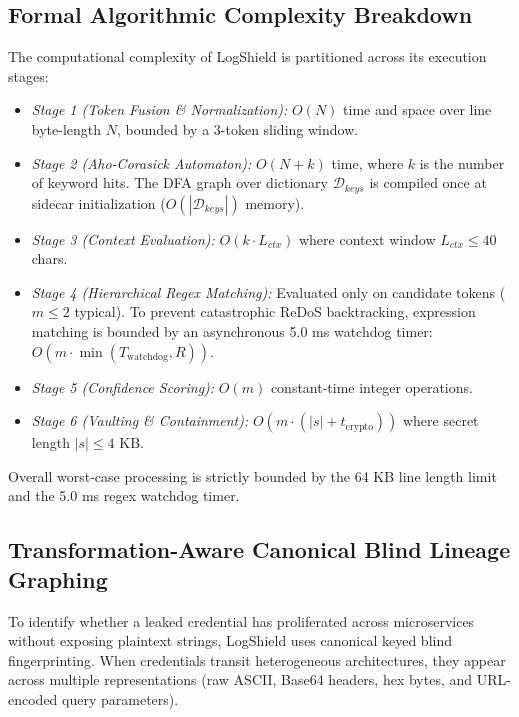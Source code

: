 \documentclass[conference]{IEEEtran}
\begin{document}
\subsection{Formal Algorithmic Complexity Breakdown}
The computational complexity of LogShield is partitioned across its execution stages:
\begin{itemize}
    \item \textit{Stage 1 (Token Fusion \& Normalization):} $O(N)$ time and space over line byte-length $N$, bounded by a 3-token sliding window.
    \item \textit{Stage 2 (Aho-Corasick Automaton):} $O(N + k)$ time, where $k$ is the number of keyword hits. The DFA graph over dictionary $\mathcal{D}_{keys}$ is compiled once at sidecar initialization ($O(|\mathcal{D}_{keys}|)$ memory).
    \item \textit{Stage 3 (Context Evaluation):} $O(k \cdot L_{ctx})$ where context window $L_{ctx} \le 40$ chars.
    \item \textit{Stage 4 (Hierarchical Regex Matching):} Evaluated only on candidate tokens ($m \le 2$ typical). To prevent catastrophic ReDoS backtracking, expression matching is bounded by an asynchronous 5.0 ms watchdog timer: $O(m \cdot \min(T_{\text{watchdog}}, R))$.
    \item \textit{Stage 5 (Confidence Scoring):} $O(m)$ constant-time integer operations.
    \item \textit{Stage 6 (Vaulting \& Containment):} $O(m \cdot (|s| + t_{\text{crypto}}))$ where secret length $|s| \le 4\text{ KB}$.
\end{itemize}
Overall worst-case processing is strictly bounded by the 64 KB line length limit and the 5.0 ms regex watchdog timer.

\subsection{Transformation-Aware Canonical Blind Lineage Graphing}
To identify whether a leaked credential has proliferated across microservices without exposing plaintext strings, LogShield uses canonical keyed blind fingerprinting. When credentials transit heterogeneous architectures, they appear across multiple representations (raw ASCII, Base64 headers, hex bytes, and URL-encoded query parameters). 
\end{document}
